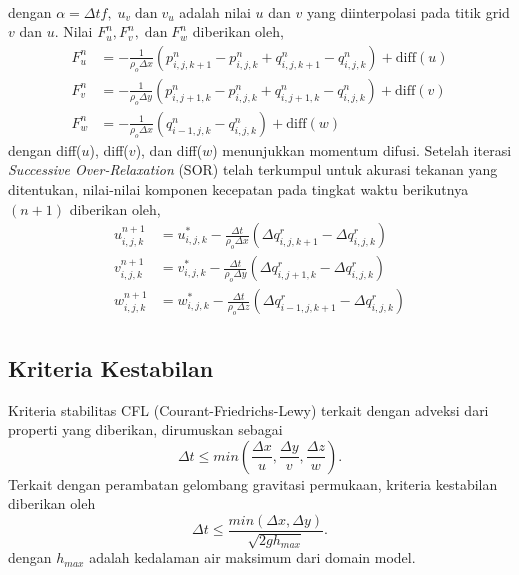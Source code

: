 \begin{spacing}{1.5}
\begin{equation}
\begin{aligned}
		\end{aligned}
	\end{equation}
	dengan $\alpha = \Delta tf, \; u_v \;\text{dan}\;v_u$ adalah nilai $u$ dan $v$ yang diinterpolasi pada titik grid $v$ dan $u$. Nilai $F_{u}^{n}, F_{v}^{n},\;\text{dan}\;F_{w}^{n}$ diberikan oleh,
	\begin{equation}
		\begin{aligned}
			F_{u}^{n} &=-\frac{1}{\rho_o \Delta x}(p_{i,j,k+1}^{n}-p_{i,j,k}^{n}+q_{i,j,k+1}^{n}-q_{i,j,k}^{n})+\text{diff}(u)\\
			F_{v}^{n} &=-\frac{1}{\rho_o \Delta y}(p_{i,j+1,k}^{n}-p_{i,j,k}^{n}+q_{i,j+1,k}^{n}-q_{i,j,k}^{n})+\text{diff}(v)\\
			F_{w}^{n} &=-\frac{1}{\rho_o \Delta x}(q_{i-1,j,k}^{n}-q_{i,j,k}^{n})+\text{diff}(w)
		\end{aligned}
	\end{equation}
	dengan diff($u$), diff($v$), dan diff($w$) menunjukkan momentum difusi. Setelah iterasi \textit{Successive Over-Relaxation} (SOR) telah terkumpul untuk akurasi tekanan yang ditentukan, nilai-nilai komponen kecepatan pada tingkat waktu berikutnya $(n+1)$ diberikan oleh,
	\begin{equation}
		\begin{aligned}
			u_{i,j,k}^{n+1} &= u_{i,j,k}^{*}-\frac{\Delta t}{\rho_o \Delta x}(\Delta q_{i,j,k+1}^{r} - \Delta q_{i,j,k}^{r})\\
			v_{i,j,k}^{n+1} &= v_{i,j,k}^{*}-\frac{\Delta t}{\rho_o \Delta y}(\Delta q_{i,j+1,k}^{r} - \Delta q_{i,j,k}^{r})\\
			w_{i,j,k}^{n+1} &= w_{i,j,k}^{*}-\frac{\Delta t}{\rho_o \Delta z}(\Delta q_{i-1,j,k+1}^{r} - \Delta q_{i,j,k}^{r})\\
		\end{aligned}
	\end{equation}
\subsection[Kriteria Kestabilan]{Kriteria Kestabilan}
	Kriteria stabilitas CFL (Courant-Friedrichs-Lewy) terkait dengan adveksi dari properti yang diberikan, dirumuskan sebagai
	\begin{equation}
		\Delta t \leq min\left(\frac{\Delta x}{u},\frac{\Delta y}{v},\frac{\Delta z}{w}\right).
	\end{equation}
	Terkait dengan perambatan gelombang gravitasi permukaan, kriteria kestabilan diberikan oleh
	\begin{equation}
		\Delta t \leq \frac{min(\Delta x,\Delta y)}{\sqrt{2gh_{max}}}.
	\end{equation} 
	dengan $h_{max}$ adalah kedalaman air maksimum dari domain model.
\end{spacing}
\vspace{-0.1pc}
